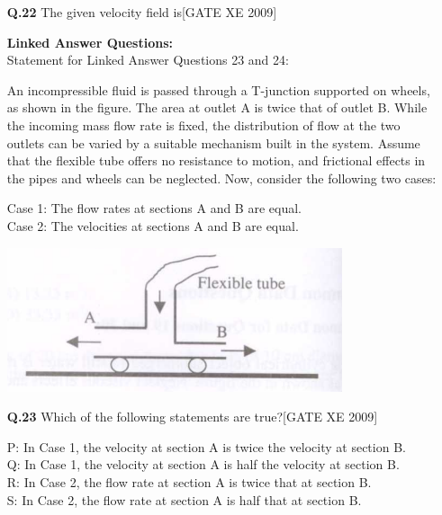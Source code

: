 \documentclass[journal,12pt,onecolumn]{IEEEtran}
\theoremstyle{remark}
\begin{document}
\begin{enumerate}
\begin{enumerate}
\vspace{0.3cm}

\item[\textbf{Q.22}] The given velocity field is\hfill[GATE XE 2009]

\begin{enumerate}[leftmargin=*, itemsep=4pt]
\end{enumerate}


\vspace{0.5cm}

\textbf{Linked Answer Questions:}\\
Statement for Linked Answer Questions 23 and 24:

An incompressible fluid is passed through a T-junction supported on wheels, as shown in the figure. The area at outlet A is twice that of outlet B. While the incoming mass flow rate is fixed, the distribution of flow at the two outlets can be varied by a suitable mechanism built in the system. Assume that the flexible tube offers no resistance to motion, and frictional effects in the pipes and wheels can be neglected. Now, consider the following two cases:

Case 1: The flow rates at sections A and B are equal.\\
Case 2: The velocities at sections A and B are equal.



\includegraphics[width=0.5\columnwidth]{figs/fig5.png}
\item[\textbf{Q.23}] Which of the following statements are true?\hfill[GATE XE 2009]

P: In Case 1, the velocity at section A is twice the velocity at section B.\\
Q: In Case 1, the velocity at section A is half the velocity at section B.\\
R: In Case 2, the flow rate at section A is twice that at section B.\\
S: In Case 2, the flow rate at section A is half that at section B.
\begin{enumerate}
    


\end{enumerate}
\end{enumerate}
\end{enumerate}
\end{document}
